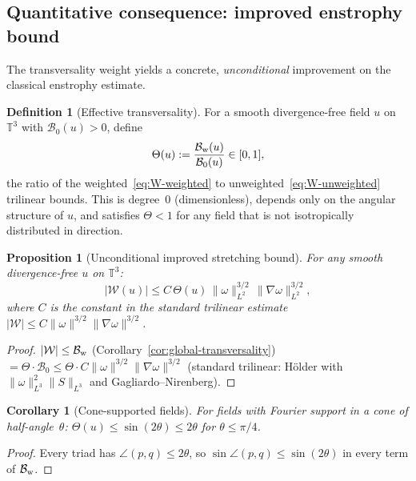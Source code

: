 \documentclass[11pt]{article}
\newtheorem{proposition}[theorem]{Proposition}
\newtheorem{corollary}[theorem]{Corollary}
\theoremstyle{definition}
\newtheorem{definition}[theorem]{Definition}
\newcommand{\T}{\mathbb{T}}
\newcommand{\cB}{\mathcal{B}}
\begin{document}
\subsection{Quantitative consequence: improved
enstrophy bound}
\label{sec:cone-improvement}

The transversality weight yields a concrete,
\emph{unconditional} improvement on the classical
enstrophy estimate.

\begin{definition}[Effective transversality]
\label{def:Theta}
For a smooth divergence-free field $u$ on $\T^3$
with $\cB_0(u)>0$, define
\begin{equation}\label{eq:Theta-def}
\Theta(u) := \frac{\cB_{\rm w}(u)}{\cB_0(u)}
\in [0,1],
\end{equation}
the ratio of the
weighted~\eqref{eq:W-weighted} to
unweighted~\eqref{eq:W-unweighted}
trilinear bounds.  This is degree~0
(dimensionless), depends only on the angular
structure of $u$, and satisfies $\Theta<1$
for any field that is not isotropically
distributed in direction.
\end{definition}

\begin{proposition}[Unconditional improved
stretching bound]
\label{prop:general-stretching}
For any smooth divergence-free $u$ on $\T^3$:
\begin{equation}\label{eq:W-general}
|\mathcal{W}(u)| \leq
C\,\Theta(u)\,\|\omega\|_{L^2}^{3/2}\,
\|\nabla\omega\|_{L^2}^{3/2},
\end{equation}
where $C$ is the constant in the standard
trilinear estimate
$|\mathcal{W}|\leq C\|\omega\|^{3/2}
\|\nabla\omega\|^{3/2}$.
\end{proposition}

\begin{proof}
$|\mathcal{W}| \leq \cB_{\rm w}$
(Corollary~\ref{cor:global-transversality})
$= \Theta\cdot\cB_0
\leq \Theta\cdot C\|\omega\|^{3/2}
\|\nabla\omega\|^{3/2}$
(standard trilinear: H\"older with
$\|\omega\|_{L^3}^2\|S\|_{L^3}$ and
Gagliardo--Nirenberg).
\end{proof}

\begin{corollary}[Cone-supported fields]
\label{cor:cone}
For fields with Fourier support in a cone of
half-angle~$\theta$: $\Theta(u)\leq\sin(2\theta)
\leq 2\theta$ for $\theta\leq\pi/4$.
\end{corollary}

\begin{proof}
Every triad has $\angle(p,q)\leq 2\theta$, so
$\sin\angle(p,q)\leq\sin(2\theta)$ in every term
of $\cB_{\rm w}$.
\end{proof}
\end{document}
